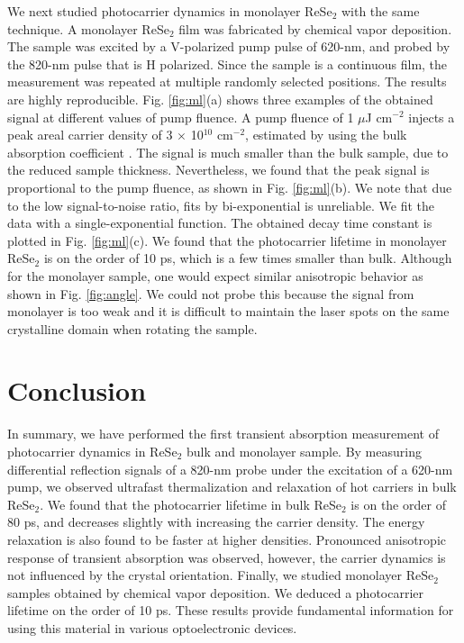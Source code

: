 \documentclass{osa-article}
\begin{document}
We next studied photocarrier dynamics in monolayer ReSe$_2$ with the same technique.  A monolayer ReSe$_2$ film was  fabricated by chemical vapor deposition. The sample was excited by a V-polarized pump pulse of 620-nm, and probed by the 820-nm pulse that is H polarized. Since the sample is a continuous film, the measurement was repeated at multiple randomly selected positions. The results are highly reproducible. Fig. \ref{fig:ml}(a) shows three examples of the obtained signal at different values of pump fluence. A pump fluence of 1 $\mu$J cm$^{-2}$ injects a peak areal carrier density of 3 $\times$ 10$^{10}$ cm$^{-2}$, estimated by using the bulk absorption coefficient \cite{jssc51170}. The signal is much smaller than the bulk sample, due to the reduced sample thickness. Nevertheless, we found that the peak signal is proportional to the pump fluence, as shown in Fig. \ref{fig:ml}(b). We note that due to the low signal-to-noise ratio, fits by bi-exponential is unreliable. We fit the data with a single-exponential function. The obtained decay time constant is plotted in Fig. \ref{fig:ml}(c). We found that the photocarrier lifetime in monolayer ReSe$_2$ is on the order of 10 ps, which is a few times smaller than bulk. Although for the monolayer sample, one would expect similar anisotropic behavior as shown in Fig. \ref{fig:angle}. We could not probe this because the signal from monolayer is too weak and it is difficult to maintain the laser spots on the same crystalline domain when rotating the sample.

\section{Conclusion}
In summary, we have performed the first transient absorption measurement of photocarrier dynamics in ReSe$_2$ bulk and monolayer sample. By measuring differential reflection signals of a 820-nm probe under the excitation of a 620-nm pump, we observed ultrafast thermalization and relaxation of hot carriers in bulk ReSe$_2$. We found that the photocarrier lifetime in bulk ReSe$_2$ is on the order of 80 ps, and decreases slightly with increasing the carrier density. The energy relaxation is also found to be faster at higher densities. Pronounced anisotropic response of transient absorption was observed, however, the carrier dynamics is not influenced by the crystal orientation. Finally, we studied monolayer ReSe$_2$ samples obtained by chemical vapor deposition. We deduced a photocarrier lifetime on the order of 10 ps. These results provide fundamental information for using this material in various optoelectronic devices.
\end{document}
